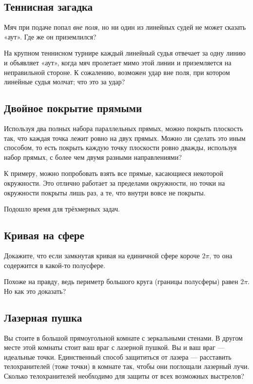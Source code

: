 \subsection*{Теннисная загадка}

Мяч при подаче попал \emph{вне поля}, но ни один из линейных судей не может сказать «аут».
Где же он приземлился?

На крупном теннисном турнире каждый линейный судья отвечает за одну линию и объявляет «аут», когда мяч пролетает мимо этой линии и приземляется на неправильной стороне.
К сожалению, возможен удар вне поля, при котором линейные судья молчат; что это за удар?

\subsection*{Двойное покрытие прямыми}

Используя два полных набора параллельных прямых, можно покрыть плоскость так, что каждая точка лежит ровно на двух прямых.
Можно ли сделать это иным способом, то есть покрыть каждую точку плоскости ровно дважды, используя набор прямых, с более чем двумя разными направлениями?

 К примеру, можно попробовать взять все прямые, касающиеся некоторой окружности.
Это отлично работает за пределами окружности, но точки на окружности покрыты лишь раз, а те, что внутри вовсе не покрыты.

\medskip

Подошло время для трёхмерных задач.

\subsection*{Кривая на сфере}

Докажите, что если замкнутая кривая на единичной сфере короче $2\pi$, то она содержится в какой-то полусфере.

 Похоже на правду, ведь периметр большого круга (границы полусферы) равен $2\pi$.
Но как это доказать?

\subsection*{Лазерная пушка}

Вы стоите в большой прямоугольной комнате с зеркальными стенами.
В другом месте этой комнаты стоит ваш враг с лазерной пушкой.
Вы и ваш враг --- идеальные точки.
Единственный способ защититься от лазера --- расставить телохранителей (тоже точки) в комнате так, чтобы они поглощали лазерный лучи.
Сколько телохранителей необходимо для защиты от всех возможных выстрелов?

